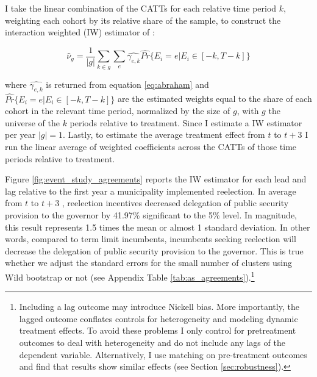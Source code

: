 \documentclass[12pt]{amsart}
\makeatletter
\def\section{\@startsection{section}{1}
	\z@{1.0\linespacing\@plus\linespacing}{.5\linespacing}{\Large}}
\numberwithin{equation}{section}
\theoremstyle{definition}
\theoremstyle{definition}
\theoremstyle{definition}
\makeatother
\begin{document}
I take the linear combination of the CATTs for each relative time period $k$, weighting each cohort by its relative share of the sample, to construct the interaction weighted (IW) estimator of \citet{abraham_sun_2020}:   

\begin{equation}
\hat{\nu}_g=\frac{1}{|g|}\sum_{k \in g}\sum_e \hat{\gamma_{e,k}} \hat{Pr}\{E_i=e | E_i \in [-k, T-k]\}	
\end{equation}

where $\hat{\gamma_{e,k}}$ is returned from equation \ref{eq:abraham} and $\hat{Pr}\{E_i=e | E_i \in [-k, T-k]\}$  are the estimated weights equal to the share of each cohort in the relevant time period, normalized by the size of  $g$, with $g$ the universe of the $k$ periods relative to treatment. Since I estimate a IW estimator per year $|g|=1$. Lastly, to estimate the average treatment effect from $t$ to $t+3$ I run the linear average of weighted coefficients across the CATTs of those time periods relative to treatment. 

\section{Main Results \label{sec:results}}


   
Figure \ref{fig:event_study_agreements} reports the IW estimator %
 for each lead and lag relative to the first year a municipality implemented reelection. In average from $t$ to $t+3$ , reelection incentives decreased delegation of public security provision to the governor by 41.97\% significant to the 5\% level. In magnitude, this result represents 1.5 times the mean or almost 1 standard deviation. In other words, compared to term limit incumbents, incumbents seeking reelection will decrease the delegation of public security provision to the governor. This is true whether we adjust the standard errors for the small number of clusters using Wild bootstrap or not (see Appendix Table \ref{tab:as_agreements}).\footnote{Including a lag outcome may introduce Nickell bias. More importantly, the lagged outcome conflates controls for heterogeneity and modeling dynamic treatment effects. To avoid these problems I only control for pretreatment outcomes to deal with heterogeneity and do not include  any lags of the dependent variable. Alternatively, I use matching on pre-treatment outcomes and find that results show similar effects (see Section \ref{sec:robustness}).}   
         
\end{document}
